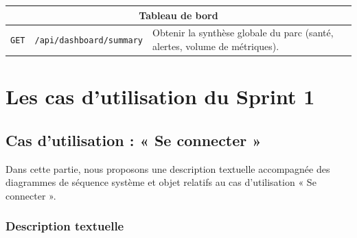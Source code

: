 \begin{longtable}{|p{1.6cm}|p{7.0cm}|p{5.8cm}|}
\multicolumn{3}{|c|}{\textbf{Tableau de bord}} \\
\hline
\texttt{GET} & \texttt{/api/dashboard/summary} & Obtenir la synthèse globale du parc (santé, alertes, volume de métriques). \\
\hline

\end{longtable}
\normalsize

\section{Les cas d'utilisation du Sprint 1}

\subsection{Cas d'utilisation : « Se connecter »}
Dans cette partie, nous proposons une description textuelle accompagnée des diagrammes
de séquence système et objet relatifs au cas d'utilisation « Se connecter ».

\subsubsection*{Description textuelle}

